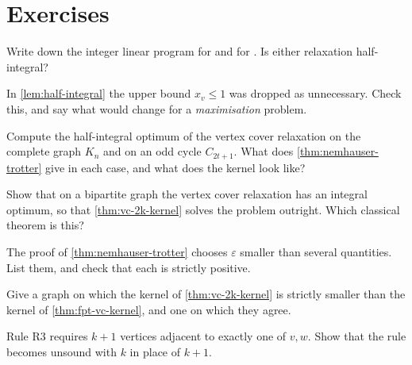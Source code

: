 \section{Exercises}
\label{sec:ex-kernelization}

\begin{exercise}
Write down the integer linear program for  and for
. Is either relaxation half-integral?
\end{exercise}

\begin{exercise}
In \cref{lem:half-integral} the upper bound $x_v \le 1$ was dropped as
unnecessary. Check this, and say what would change for a \emph{maximisation}
problem.
\end{exercise}

\begin{exercise}
Compute the half-integral optimum of the vertex cover relaxation on the complete
graph $K_n$ and on an odd cycle $C_{2t+1}$. What does
\cref{thm:nemhauser-trotter} give in each case, and what does the kernel look
like?
\end{exercise}

\begin{exercise}
Show that on a bipartite graph the vertex cover relaxation has an integral
optimum, so that \cref{thm:vc-2k-kernel} solves the problem outright. Which
classical theorem is this?
\end{exercise}

\begin{exercise}
The proof of \cref{thm:nemhauser-trotter} chooses $\varepsilon$ smaller than
several quantities. List them, and check that each is strictly positive.
\end{exercise}

\begin{exercise}
Give a graph on which the kernel of \cref{thm:vc-2k-kernel} is strictly smaller
than the kernel of \cref{thm:fpt-vc-kernel}, and one on which they agree.
\end{exercise}

\begin{exercise}
Rule R3 requires $k+1$ vertices adjacent to exactly one of $v,w$. Show that the
rule becomes unsound with $k$ in place of $k+1$.
\end{exercise}

